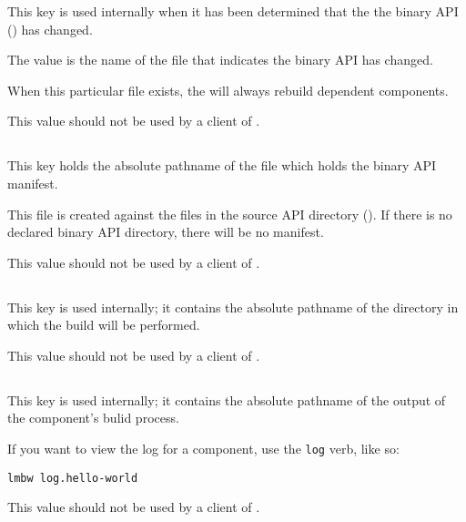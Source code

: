 This key is used internally when it has been determined that the the
binary API () has changed.

The value is the name of the file that indicates the binary API has
changed.

When this particular file exists, the \lmsbw will always rebuild
dependent components.

This value should not be used by a client of \lmsbw.

\subsection{}

This key holds the absolute pathname of the file which holds the
binary API \mtree manifest.

This file is created against the files in the source API directory
().  If there is no declared binary API
directory, there will be no manifest.

This value should not be used by a client of \lmsbw.

\subsection{}

This key is used internally; it contains the absolute pathname of the
directory in which the build will be performed.

This value should not be used by a client of \lmsbw.

\subsection{}

This key is used internally; it contains the absolute pathname of the
output of the component's bulid process.

If you want to view the log for a component, use the \texttt{log}
verb, like so:

\begin{verbatim}
lmbw log.hello-world
\end{verbatim}

This value should not be used by a client of \lmsbw.

\subsection{}

